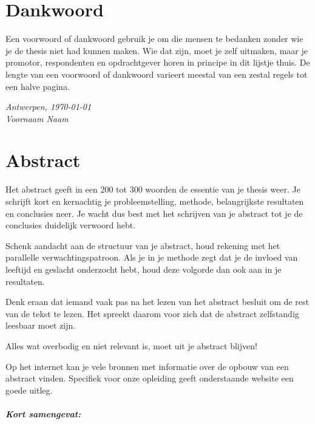 
\frontmatter
\thispagestyle{empty}   


\chapter{Dankwoord}
\vspace{0.35in}

Een voorwoord of dankwoord gebruik je om die mensen te bedanken zonder wie je de thesis niet had kunnen maken. 
Wie dat zijn, moet je zelf uitmaken, maar je promotor, respondenten en opdrachtgever horen in principe in dit lijstje thuis. 
De lengte van een voorwoord of dankwoord varieert meestal van een zestal regels tot een halve pagina.


\begin{flushright}{\emph{Antwerpen, \today \\
Voornaam Naam}}
\end{flushright}


\chapter{Abstract}
Het abstract geeft in een 200 tot 300 woorden de essentie van je thesis weer. 
Je schrijft kort en kernachtig je probleemstelling, methode, belangrijkste resultaten en conclusies neer. 
Je wacht dus best met het schrijven van je abstract tot je de conclusies duidelijk verwoord hebt.

Schenk aandacht aan de structuur van je abstract, houd rekening met het parallelle verwachtingspatroon. 
Als je in je methode zegt dat je de invloed van leeftijd en geslacht onderzocht hebt, houd deze volgorde dan ook aan in je resultaten. 

Denk eraan dat iemand vaak pas na het lezen van het abstract besluit om de rest van de tekst te lezen. 
Het spreekt daarom voor zich dat de abstract zelfstandig leesbaar moet zijn.

Alles wat overbodig en niet relevant is, moet uit je abstract blijven!

Op het internet kan je vele bronnen met informatie over de opbouw van een abstract vinden.
Specifiek voor onze opleiding geeft onderstaande website een goede uitleg.


\paragraph{Kort samengevat:}

